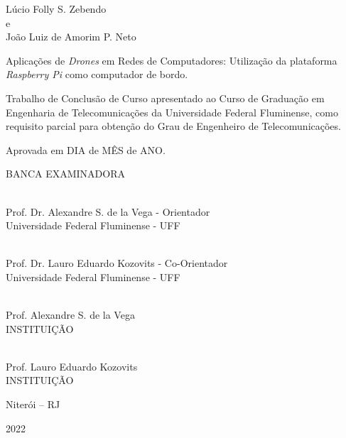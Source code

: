 \documentclass[12pt,a4paper,oneside]{book}
\begin{document}
\vspace*{\fill}

\clearpage




\begin{center}

Lúcio Folly S. Zebendo\\e\\João Luiz de Amorim P. Neto

\vspace{1.0cm}

Aplica\c{c}\~{o}es de \textit{Drones} em Redes de Computadores: Utilização da plataforma \textit{Raspberry Pi} como computador de bordo.

\vspace{1.0cm}

\begin{flushright}
\begin{minipage}{0.55\textwidth}
%
Trabalho de Conclusão de Curso 
apresentado ao Curso de Graduação em Engenharia de Telecomunicações 
da Universidade Federal Fluminense, 
como requisito parcial para obtenção 
do Grau de Engenheiro de Telecomunicações. 
%
\end{minipage}
\end{flushright}

\vfill

\begin{flushleft}

Aprovada em DIA de MÊS de ANO.

\end{flushleft}

\vfill

BANCA EXAMINADORA

\vfill

\hrulefill \\
Prof. Dr. Alexandre S. de la Vega - Orientador\\
Universidade Federal Fluminense - UFF

\vfill

\hrulefill \\
Prof. Dr. Lauro Eduardo Kozovits - Co-Orientador\\
Universidade Federal Fluminense - UFF

\vfill

\hrulefill \\
Prof. Alexandre S. de la Vega\\
INSTITUIÇÃO

\vfill

\hrulefill \\
Prof. Lauro Eduardo Kozovits\\
INSTITUIÇÃO

\vfill

Niterói -- RJ

2022

\end{center}
\end{document}
